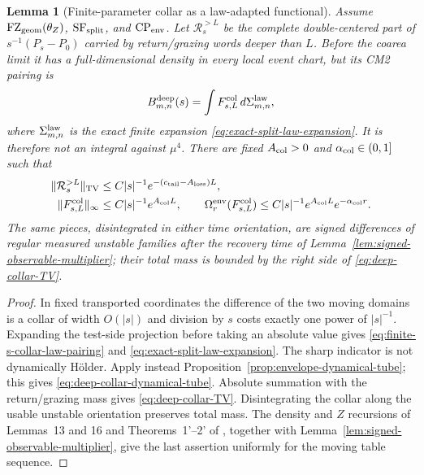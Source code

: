 \documentclass[11pt]{article}
\newtheorem{lemma}[theorem]{Lemma}
\begin{document}
\begin{lemma}[Finite-parameter collar as a law-adapted functional]
\label{lem:finite-s-collar-admissibility}
Assume $\mathrm{FZ}_{\rm geom}(\theta_Z)$,
$\mathrm{SF}_{\rm split}$, and $\mathrm{CP}_{\rm env}$.
Let $\mathcal R_s^{>L}$ be the complete double-centered part of
$s^{-1}(P_s-P_0)$ carried by return/grazing words deeper than $L$.  Before
the coarea limit it has a full-dimensional density in every local event chart,
but its CM2 pairing is
\begin{equation}
\label{eq:finite-s-collar-law-pairing}
 B^{\rm deep}_{m,n}(s)=
 \int F_{s,L}^{\rm col}\,d\Sigma_{m,n}^{\rm law},
\end{equation}
where $\Sigma_{m,n}^{\rm law}$ is the exact finite expansion
\eqref{eq:exact-split-law-expansion}.  It is therefore not an integral against
$\mu^4$.
There are fixed $A_{\rm col}>0$ and $\alpha_{\rm col}\in(0,1]$ such that
\begin{align}
 \|\mathcal R_s^{>L}\|_{\rm TV}
 &\le C|s|^{-1}e^{-(c_{\rm tail}-A_{\rm loss})L},
 \label{eq:deep-collar-TV}\\
 \|F_{s,L}^{\rm col}\|_\infty
 &\le C|s|^{-1}e^{A_{\rm col}L},\qquad
 \Omega_r^{\rm env}(F_{s,L}^{\rm col})
 \le C|s|^{-1}e^{A_{\rm col}L}e^{-\alpha_{\rm col}r}.
 \label{eq:deep-collar-dynamical-tube}
\end{align}
The same pieces, disintegrated in either time orientation, are signed
differences of regular measured unstable families after the recovery time of
Lemma~\ref{lem:signed-observable-multiplier}; their total mass is bounded by
the right side of \eqref{eq:deep-collar-TV}.
\end{lemma}

\begin{proof}
In fixed transported coordinates the difference of the two moving domains is
a collar of width $O(|s|)$ and division by $s$ costs exactly one power of
$|s|^{-1}$.  Expanding the test-side projection before taking an absolute
value gives \eqref{eq:finite-s-collar-law-pairing} and
\eqref{eq:exact-split-law-expansion}.  The sharp indicator is not dynamically
H\"older.  Apply instead Proposition~\ref{prop:envelope-dynamical-tube}; this gives
\eqref{eq:deep-collar-dynamical-tube}.  Absolute summation with the
return/grazing mass gives \eqref{eq:deep-collar-TV}.  Disintegrating the collar
along the usable unstable orientation preserves total mass.  The density and
$Z$ recursions of Lemmas~13 and 16 and Theorems~1'--2' of \cite{SYZ}, together
with Lemma~\ref{lem:signed-observable-multiplier}, give the last assertion
uniformly for the moving table sequence.
\end{proof}
\end{document}
